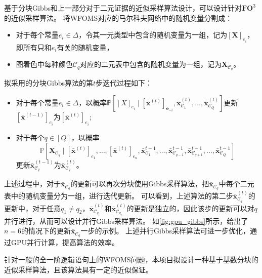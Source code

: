 \documentclass[12pt,UTF8,AutoFakeBold=3,a4paper]{ctexart} %
\newcommand{\wfoms}{WFOMS}
\newcommand{\fothree}{\ensuremath{\mathbf{FO}^3}}
\newcommand{\domain}{\Delta}
\newcommand{\vecx}{\mathbf{x}}
\newcommand{\pro}{\mathbb{P}}
\begin{document}
基于分块Gibbs和上一部分对于二元证据的近似采样算法设计，可以设计针对\fothree{}的近似采样算法。
将WFOMS对应的马尔科夫网络中的随机变量分割成：
\begin{itemize}
  \item 对于每个常量$e_i\in\domain$，令其一元类型中包含的随机变量为一组，记为$[\mathbf{X}]_{e_i}$，即所有只和$e_i$有关的随机变量，
  \item 图着色中每种颜色$\mathcal{C}_q$对应的二元表中包含的随机变量为一组，记为$\mathbf{X}_{\mathcal{C}_q}$。
\end{itemize}
拟采用的分块Gibbs算法的第$t$步迭代过程如下：
\begin{itemize}
    \item 对于每个常量$e_i\in\domain$，以概率$\pro\left[[X]_{e_i}\mid [\bar{\vecx}^{(t)}]_{\mathbf{e}_{-i}}, \bar{\vecx}_{\mathcal{C}_1}^{(t)},\dots,\bar{\vecx}_{\mathcal{C}_Q}^{(t)}\right]$更新$[\bar{\vecx}^{(t-1)}]_{e_i}$为$[\bar{\vecx}^{(t)}]_{e_i}$;
    \item 对于每个$q\in[Q]$，以概率
    \begin{equation*}
        \pro\left[\mathbf{X}_{\mathcal{C}_q}\mid [\bar{\vecx}^{(t)}]_{e_1},\dots,[\bar{\vecx}^{(t)}]_{e_n},\bar{\vecx}^{t-1}_{\mathcal{C}_1},\dots, \bar{\vecx}^{t-1}_{\mathcal{C}_{q-1}}, \bar{\vecx}^{t-1}_{\mathcal{C}_{q+1}},\dots, \bar{\vecx}^{t-1}_{\mathcal{C}_{Q}}\right]
    \end{equation*}
    更新$\bar{\vecx}_{\mathcal{C}_q}^{(t-1)}$为$\bar{\vecx}_{\mathcal{C}_q}^{(t)}$。
\end{itemize}
上述过程中，对于$\bar{\vecx}_{\mathcal{C}_q}$的更新可以再次分块使用Gibbs采样算法，把$\bar{\vecx}_{\mathcal{C}_q}$中每个二元表中的随机变量分为一组，进行迭代更新。
可以看到，上述算法的第二步$\bar{\vecx}_{\mathcal{C}_q}^{(t)}$的更新中，对于任意$q_1\neq q_2$，$\bar{\vecx}_{\mathcal{C}_{q_1}}^{(t)}$和$\bar{\vecx}_{\mathcal{C}_{q_2}}^{(t)}$的更新是独立的，因此该步的更新可以对$q$并行进行，从而可以设计并行Gibbs采样算法。
如\cref{fig:gpu_gibbs}所示，给出了$n=6$的情况下的更新$\bar{\vecx}_{\mathcal{C}_q}$一步的示例。
上述并行Gibbs采样算法可进一步优化，通过GPU并行计算，提高算法的效率。


针对一般的全一阶逻辑语句上的\wfoms{}问题，本项目拟设计一种基于基数分块的近似采样算法，且该算法具有一定的近似保证。
\end{document}
